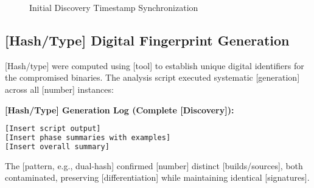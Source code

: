 \documentclass[12pt,a4paper]{article}
\newcommand{\timestamp}[1]{\textbf{#1}}
\begin{document}
\begin{figure}[htbp]
\centering
{}
\caption{Initial Discovery Timestamp Synchronization}
\label{fig:timestamp_sync}
\end{figure}

\subsection{[Hash/Type] Digital Fingerprint Generation}
[Hash/type] were computed using [tool] to establish unique digital identifiers for the compromised binaries. The analysis script executed systematic [generation] across all [number] instances:

\textbf{[Hash/Type] Generation Log (Complete [Discovery]):}
\begin{lstlisting}[style=terminal, caption={[Type] Production Build Identification}, language=bash]
[Insert script output]
[Insert phase summaries with examples]
[Insert overall summary]
\end{lstlisting}

The [pattern, e.g., dual-hash] confirmed [number] distinct [builds/sources], both contaminated, preserving [differentiation] while maintaining identical [signatures].
\end{document}
